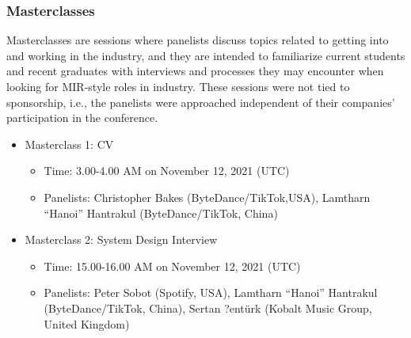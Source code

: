 \documentclass[%
10pt,								%
]
{scrartcl}
\begin{document}
        \subsubsection{Masterclasses}
            Masterclasses are sessions where panelists discuss topics related to getting into and working in the industry, and they are intended to familiarize current students and recent graduates with interviews and processes they may encounter when looking for MIR-style roles in industry. These sessions were not tied to sponsorship, i.e., the panelists were approached independent of their companies’ participation in the conference.
             \begin{itemize}
                \item Masterclass 1: CV
                    \begin{itemize}
                        \item   Time: 3.00-4.00 AM on November 12, 2021 (UTC)
                        \item   Panelists: Christopher Bakes (ByteDance/TikTok,USA), Lamtharn “Hanoi” Hantrakul (ByteDance/TikTok, China)
                    \end{itemize}
                \item Masterclass 2: System Design Interview
                    \begin{itemize}
                        \item   Time: 15.00-16.00 AM on November 12, 2021 (UTC)
                        \item   Panelists: Peter Sobot (Spotify, USA), Lamtharn “Hanoi” Hantrakul (ByteDance/TikTok, China), Sertan ?entürk (Kobalt Music Group, United Kingdom)
                    \end{itemize}
            \end{itemize}
    
\end{document}

